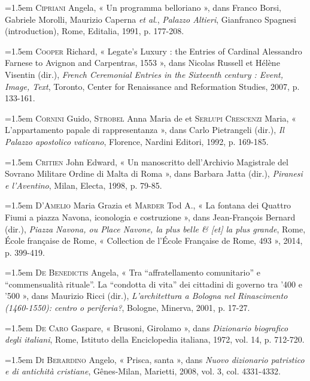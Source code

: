 \documentclass[12pt,twoside,openany]{book}
\newenvironment{PurhBibliography}
  {%
    \par
    \setlength{\parindent}{0pt}%
    \setlength{\leftskip}{0pt}%
  }
  {%
    \par
  }
\begin{document}
\begin{PurhBibliography}
\noindent\hangindent=1.5em \textsc{Cipriani} Angela, « Un programma belloriano », dans Franco Borsi, Gabriele Morolli, Maurizio Caperna \textit{et al}., \textit{Palazzo Altieri}, Gianfranco Spagnesi (introduction), Rome, Editalia, 1991, p. 177-208.\par
\noindent\hangindent=1.5em \textsc{Cooper} Richard, « Legate’s Luxury : the Entries of Cardinal Alessandro Farnese to Avignon and Carpentras, 1553 », dans Nicolas Russell et Hélène Visentin (dir.), \textit{French Ceremonial Entries in the Sixteenth century : Event, Image, Text}, Toronto, Center for Renaissance and Reformation Studies, 2007, p. 133-161.\par
\noindent\hangindent=1.5em \textsc{Cornini} Guido, \textsc{Strobel} Anna Maria de et \textsc{Serlupi Crescenzi} Maria, « L’appartamento papale di rappresentanza », dans Carlo Pietrangeli (dir.), \textit{Il Palazzo apostolico vaticano}, Florence, Nardini Editori, 1992, p. 169-185.\par
\noindent\hangindent=1.5em \textsc{Critien} John Edward, « Un manoscritto dell’Archivio Magistrale del Sovrano Militare Ordine di Malta di Roma », dans Barbara Jatta (dir.), \textit{Piranesi e l’Aventino}, Milan, Electa, 1998, p. 79-85.\par
\noindent\hangindent=1.5em \textsc{D’Amelio} Maria Grazia et \textsc{Marder} Tod A., « La fontana dei Quattro Fiumi a piazza Navona, iconologia e costruzione », dans Jean-François Bernard (dir.), \textit{Piazza Navona, ou Place Navone, la plus belle \& [et] la plus grande}, Rome, École française de Rome, « Collection de l’École Française de Rome, 493 », 2014, p. 399-419.\par
\noindent\hangindent=1.5em \textsc{De Benedictis} Angela, « Tra “affratellamento comunitario” e “commensualità rituale”. La “condotta di vita” dei cittadini di governo tra ’400 e ’500 », dans Maurizio Ricci (dir.), \textit{L’architettura a Bologna nel Rinascimento (1460-1550): centro o periferia?}, Bologne, Minerva, 2001, p. 17-27.\par
\noindent\hangindent=1.5em \textsc{De Caro} Gaspare, « Brusoni, Girolamo », dans\textit{ Dizionario biografico degli italiani}, Rome, Istituto della Enciclopedia italiana, 1972, vol. 14, p. 712-720.\par
\noindent\hangindent=1.5em \textsc{Di Berardino} Angelo, « Prisca, santa », dans \textit{Nuovo dizionario patristico e di antichità cristiane}, Gênes-Milan, Marietti, 2008, vol. 3, col. 4331-4332.\par

\end{PurhBibliography}
\end{document}
